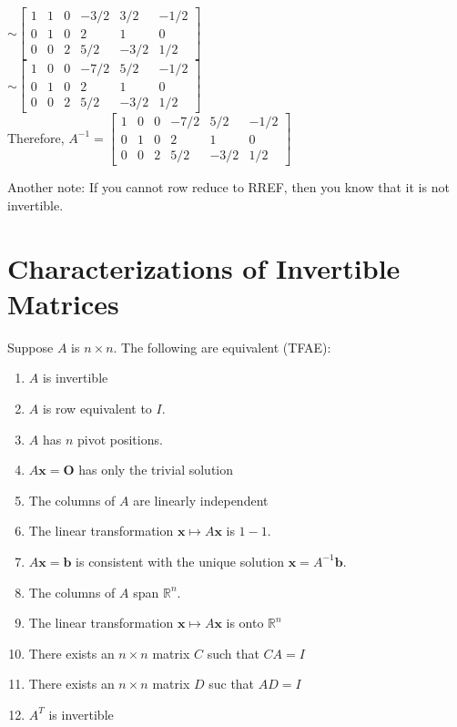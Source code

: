 \documentclass{report}
\begin{document}
\begin{example}
$\sim\begin{bmatrix}
	1 & 1 & 0 & -3/2 & 3/2 & -1/2 \\
	0 & 1 & 0 & 2 & 1 & 0 \\
	0 & 0 & 2 & 5/2 & -3/2 & 1/2 
\end{bmatrix}$\\\vspace{2mm}
$\sim\begin{bmatrix}
	1 & 0 & 0 & -7/2 & 5/2 & -1/2 \\
	0 & 1 & 0 & 2 & 1 & 0 \\
	0 & 0 & 2 & 5/2 & -3/2 & 1/2 
\end{bmatrix}$\\\vspace{2mm}
Therefore, $A^{-1}=\begin{bmatrix}
	1 & 0 & 0 & -7/2 & 5/2 & -1/2 \\
	0 & 1 & 0 & 2 & 1 & 0 \\
	0 & 0 & 2 & 5/2 & -3/2 & 1/2 
\end{bmatrix}$
\end{example}

Another note: If you cannot row reduce to RREF, then you know that it is not invertible.

\section{Characterizations of Invertible Matrices}

\begin{theorem}
Suppose $A$ is $n\times n$. The following are equivalent (TFAE):
\begin{enumerate}
	\item $A$ is invertible
	\item $A$ is row equivalent to $I$.
	\item $A$ has $n$ pivot positions.
	\item $A\mathbf{x}=\mathbf{O}$ has only the trivial solution
	\item The columns of $A$ are linearly independent
	\item The linear transformation $\mathbf{x}\mapsto A\mathbf{x}$ is $1-1$.
	\item $A\mathbf{x}=\mathbf{b}$ is consistent with the unique solution $\mathbf{x}=A^{-1}\mathbf{b}$.
	\item The columns of $A$ span $\mathbb{R}^n$.
	\item The linear transformation $\mathbf{x}\mapsto A\mathbf{x}$ is onto $\mathbb{R}^n$
	\item There exists an $n\times n$ matrix $C$ such that $CA=I$
	\item There exists an $n\times n$ matrix $D$ suc that $AD=I$
	\item $A^T$ is invertible
\end{enumerate}
\end{theorem}
\end{document}
